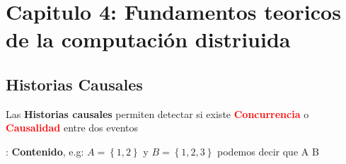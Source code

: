 \section{Capitulo 4: Fundamentos teoricos de la computación distriuida}
\subsection{Historias Causales}
Las \textbf{Historias causales} permiten detectar si existe \textcolor{red}{\textbf{Concurrencia}} o \textcolor{red}{\textbf{Causalidad}} entre dos eventos

\begin{center}
    \subset : \textbf{Contenido}, e.g: $A=\left\{1,2\right\} $ y $B=\left\{1,2,3\right\}$ podemos decir que A \subset B
\end{center}